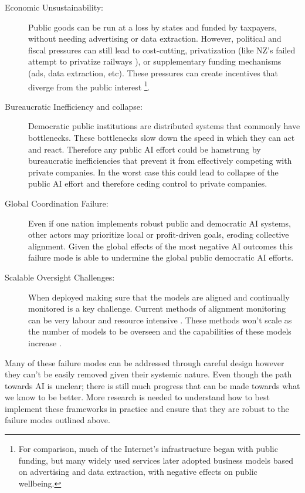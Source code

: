 \begin{description}
  \item[Economic Unsustainability:] Public goods can be run at a loss by states and funded by taxpayers, without needing advertising or data extraction. However, political and fiscal pressures can still lead to cost-cutting, privatization (like NZ's failed attempt to privatize railways \cite{clarkSellingFamilyTin2011}), or supplementary funding mechanisms (ads, data extraction, etc). These pressures can create incentives that diverge from the public interest \footnote{For comparison, much of the Internet's infrastructure began with public funding, but many widely used services later adopted business models based on advertising and data extraction, with negative effects on public wellbeing.}.
  
  \item[Bureaucratic Inefficiency and collapse:] Democratic public institutions are distributed systems that commonly have bottlenecks. These bottlenecks slow down the speed in which they can act and react. Therefore any public AI effort could be hamstrung by bureaucratic inefficiencies that prevent it from effectively competing with private companies. In the worst case this could lead to collapse of the public AI effort and therefore ceding control to private companies.

  \item[Global Coordination Failure:] Even if one nation implements robust public and democratic AI systems, other actors may prioritize local or profit-driven goals, eroding collective alignment. Given the global effects of the most negative AI outcomes this failure mode is able to undermine the global public democratic AI efforts.
  
  \item[Scalable Oversight Challenges:] When deployed making sure that the models are aligned and continually monitored is a key challenge. Current methods of alignment monitoring can be very labour and resource intensive \cite{jiAIAlignmentComprehensive2025}. These methods won't scale as the number of models to be overseen and the capabilities of these models increase \cite{kentonScalableOversightWeak2024a,engelsScalingLawsScalable2025,bowmanMeasuringProgressScalable2022}.
  

\end{description}

Many of these failure modes can be addressed through careful design however they can't be easily removed given their systemic nature. Even though the path towards  AI is unclear; there is still much progress that can be made towards what we know to be better. More research is needed to understand how to best implement these frameworks in practice and ensure that they are robust to the failure modes outlined above.

